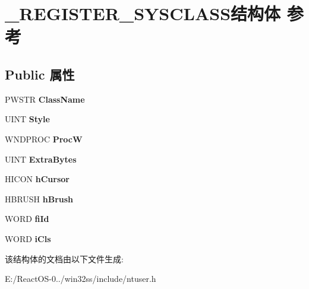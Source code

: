\hypertarget{struct___r_e_g_i_s_t_e_r___s_y_s_c_l_a_s_s}{}\section{\+\_\+\+R\+E\+G\+I\+S\+T\+E\+R\+\_\+\+S\+Y\+S\+C\+L\+A\+S\+S结构体 参考}
\label{struct___r_e_g_i_s_t_e_r___s_y_s_c_l_a_s_s}
\subsection*{Public 属性}
\begin{DoxyCompactItemize}
\item 
\mbox{\label{struct___r_e_g_i_s_t_e_r___s_y_s_c_l_a_s_s_acc377df808942b9cf087a882b89abd7c}} 
P\+W\+S\+TR {\bfseries Class\+Name}
\item 
\mbox{\label{struct___r_e_g_i_s_t_e_r___s_y_s_c_l_a_s_s_a8936cd7618ca7963c7fac470676dc2fb}} 
U\+I\+NT {\bfseries Style}
\item 
\mbox{\label{struct___r_e_g_i_s_t_e_r___s_y_s_c_l_a_s_s_afe56a43cc1a2f9a67305120dbf2f6812}} 
W\+N\+D\+P\+R\+OC {\bfseries ProcW}
\item 
\mbox{\label{struct___r_e_g_i_s_t_e_r___s_y_s_c_l_a_s_s_ae94fc640333ea1d240e4a6783a306857}} 
U\+I\+NT {\bfseries Extra\+Bytes}
\item 
\mbox{\label{struct___r_e_g_i_s_t_e_r___s_y_s_c_l_a_s_s_a2ce2d7c873fa49c80e49614807999df3}} 
H\+I\+C\+ON {\bfseries h\+Cursor}
\item 
\mbox{\label{struct___r_e_g_i_s_t_e_r___s_y_s_c_l_a_s_s_a31f3594a6845632d52db588b7918207d}} 
H\+B\+R\+U\+SH {\bfseries h\+Brush}
\item 
\mbox{\label{struct___r_e_g_i_s_t_e_r___s_y_s_c_l_a_s_s_a603a0131282c4626524aace09eba3693}} 
W\+O\+RD {\bfseries fi\+Id}
\item 
\mbox{\label{struct___r_e_g_i_s_t_e_r___s_y_s_c_l_a_s_s_a577540c0621790fb2fe114079e269983}} 
W\+O\+RD {\bfseries i\+Cls}
\end{DoxyCompactItemize}


该结构体的文档由以下文件生成\+:\begin{DoxyCompactItemize}
\item 
E\+:/\+React\+O\+S-\/0../win32ss/include/ntuser.\+h\end{DoxyCompactItemize}
